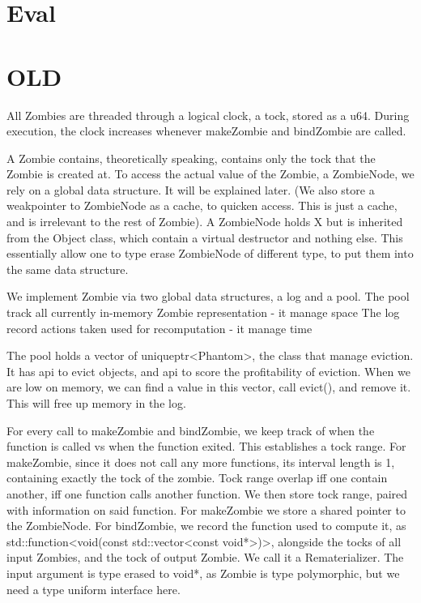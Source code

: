 \documentclass[acmsmall]{acmart}
\begin{document}
	\section{Eval}
	
	\section{OLD}
	All Zombies are threaded through a logical clock, a tock, stored as a u64.
	During execution, the clock increases whenever makeZombie and bindZombie are called.
	
	A Zombie contains, theoretically speaking, contains only the tock that the Zombie is created at.
	To access the actual value of the Zombie, a ZombieNode, we rely on a global data structure.
	It will be explained later.
	(We also store a weakpointer to ZombieNode as a cache, to quicken access. This is just a cache, and is irrelevant to the rest of Zombie).
	A ZombieNode holds X but is inherited from the Object class, which contain a virtual destructor and nothing else. This essentially allow one to type erase ZombieNode of different type, to put them into the same data structure.
	
	We implement Zombie via two global data structures, a log and a pool.
	The pool track all currently in-memory Zombie representation - it manage space
	The log record actions taken used for recomputation - it manage time
	
	The pool holds a vector of uniqueptr<Phantom>, the class that manage eviction.
	It has api to evict objects, and api to score the profitability of eviction.
	When we are low on memory, we can find a value in this vector, call evict(), and remove it.
	This will free up memory in the log.
	
	For every call to makeZombie and bindZombie, we keep track of when the function is called vs when the function exited. This establishes a tock range. 
	For makeZombie, since it does not call any more functions, its interval length is 1, containing exactly the tock of the zombie.
	Tock range overlap iff one contain another, iff one function calls another function. We then store tock range, paired with information on said function. 
	For makeZombie we store a shared pointer to the ZombieNode. 
	For bindZombie, we record the function used to compute it, as std::function<void(const std::vector<const void*>)>, alongside the tocks of all input Zombies, and the tock of output Zombie. We call it a Rematerializer. The input argument is type erased to void*, as Zombie is type polymorphic, but we need a type uniform interface here.
	
\end{document}
